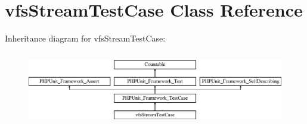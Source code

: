 \hypertarget{classorg_1_1bovigo_1_1vfs_1_1vfs_stream_test_case}{}\section{vfs\+Stream\+Test\+Case Class Reference}
\label{classorg_1_1bovigo_1_1vfs_1_1vfs_stream_test_case}
Inheritance diagram for vfs\+Stream\+Test\+Case\+:\begin{figure}[H]
\begin{center}
\leavevmode
\includegraphics[height=3.303835cm]{classorg_1_1bovigo_1_1vfs_1_1vfs_stream_test_case}
\end{center}
\end{figure}
